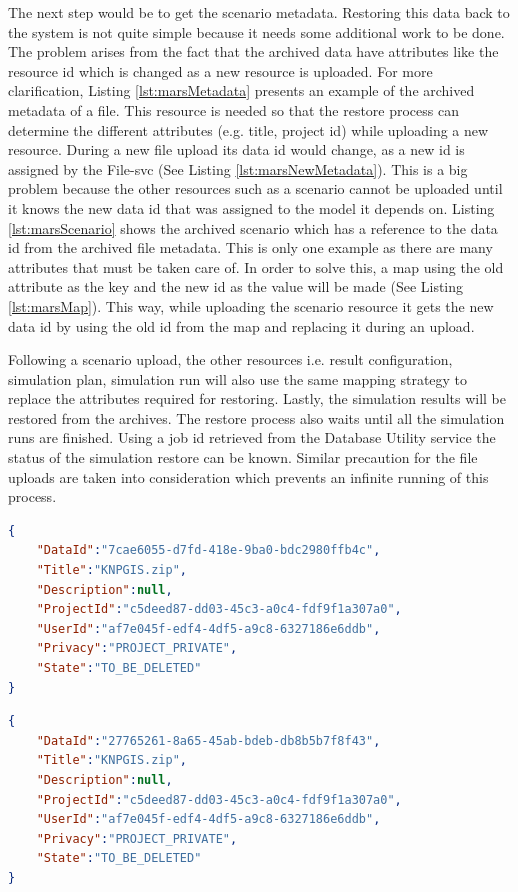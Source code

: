 The next step would be to get the scenario metadata. Restoring this data back to the system is not quite simple because it needs some additional 
work to be done. 
The problem arises from the fact that the archived data have attributes like the resource id which is changed as a new resource is uploaded. For more clarification, 
Listing \ref{lst:marsMetadata} presents an example of the archived metadata of a file. This resource is needed so that the restore process can determine the different 
attributes (e.g. title, project id) while uploading a new resource. During a new file upload 
its data id  would change, as a new id is assigned by the File-svc (See Listing \ref{lst:marsNewMetadata}). 
This is a big problem because the other resources such as a scenario cannot be uploaded until it knows the new data id that was assigned to the model it 
depends on. Listing \ref{lst:marsScenario} shows the archived scenario which has a reference to the data id from the archived file metadata. 
This is only one example as there are many attributes that must be taken care of. In order to solve this, a map using the old attribute as the key and the 
new id as the value will be made (See Listing \ref{lst:marsMap}).
This way, while uploading the scenario resource it gets the new data id by using the old id from the map and replacing it during an upload. 

Following a scenario upload, the other resources i.e. result configuration, simulation plan, simulation run will also use the same mapping strategy to replace 
the attributes required for restoring. 
Lastly, the simulation results will be restored from the archives. The restore process also waits until all the simulation runs are finished. Using a job id retrieved from the Database 
Utility service the status of the simulation restore can be known. Similar precaution for the file uploads are taken into consideration which prevents an infinite running
of this process.


\newpage
\begin{lstlisting}[caption={Snippet of archived MARS metadata resource}, language=json,firstnumber=1, captionpos=b, label={lst:marsMetadata}]
{
    "DataId":"7cae6055-d7fd-418e-9ba0-bdc2980ffb4c",
    "Title":"KNPGIS.zip",
    "Description":null,
    "ProjectId":"c5deed87-dd03-45c3-a0c4-fdf9f1a307a0",
    "UserId":"af7e045f-edf4-4df5-a9c8-6327186e6ddb",
    "Privacy":"PROJECT_PRIVATE",
    "State":"TO_BE_DELETED"
}
\end{lstlisting}

\begin{lstlisting}[caption={Snippet of the uploaded MARS metadata resource}, language=json,firstnumber=1, captionpos=b, label={lst:marsNewMetadata}]
{
    "DataId":"27765261-8a65-45ab-bdeb-db8b5b7f8f43",
    "Title":"KNPGIS.zip",
    "Description":null,
    "ProjectId":"c5deed87-dd03-45c3-a0c4-fdf9f1a307a0",
    "UserId":"af7e045f-edf4-4df5-a9c8-6327186e6ddb",
    "Privacy":"PROJECT_PRIVATE",
    "State":"TO_BE_DELETED"
}
\end{lstlisting}

